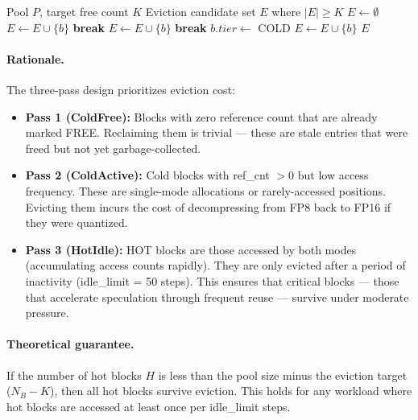 \documentclass[review]{elsarticle}
\theoremstyle{definition}
\theoremstyle{remark}
\begin{document}
\begin{algorithm}[t]
\caption{Three-pass tiered eviction.}
\label{alg:evict}
\begin{algorithmic}[1]
\Require Pool $P$, target free count $K$
\Ensure Eviction candidate set $E$ where $|E| \ge K$
\State $E \gets \emptyset$
    \State $E \gets E \cup \{b\}$
\EndFor
{}
     \State \textbf{break} \EndIf
    \State $E \gets E \cup \{b\}$
\EndFor
{}
     \State \textbf{break} \EndIf
    \State $b.tier \gets$ COLD
    \State $E \gets E \cup \{b\}$
\EndFor
\State \Return $E$
\end{algorithmic}
\end{algorithm}

\paragraph{Rationale.}
The three-pass design prioritizes eviction cost:

\begin{itemize}
    \item \textbf{Pass 1 (ColdFree):} Blocks with zero reference count
    that are already marked FREE. Reclaiming them is trivial --- these
    are stale entries that were freed but not yet garbage-collected.

    \item \textbf{Pass 2 (ColdActive):} Cold blocks with ref\_cnt $> 0$
    but low access frequency. These are single-mode allocations
    or rarely-accessed positions. Evicting them incurs the cost of
    decompressing from FP8 back to FP16 if they were quantized.

    \item \textbf{Pass 3 (HotIdle):} HOT blocks are those accessed by
    both modes (accumulating access counts rapidly). They are only
    evicted after a period of inactivity (idle\_limit = 50 steps).
    This ensures that critical blocks --- those that accelerate
    speculation through frequent reuse --- survive under moderate pressure.
\end{itemize}

\paragraph{Theoretical guarantee.}
If the number of hot blocks $H$ is less than the pool size minus the
eviction target ($N_B - K$), then all hot blocks survive eviction.
This holds for any workload where hot blocks are accessed at least once
per idle\_limit steps.
\end{document}
